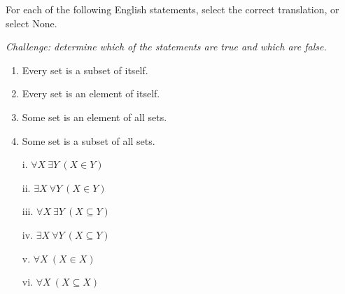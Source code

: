 
For each of the following English statements, select
the correct translation, or select None.

{\it Challenge: determine which of the statements are true and which 
are false.}

\begin{enumerate}
\item Every set is a subset of itself.

\item Every set is an element of itself.

\item Some set is an element of all sets.

\item Some set is a subset of all sets.
\end{enumerate}

\begin{enumerate}
\item[i.] $\forall X ~\exists Y ~(X \in Y)$
\item[ii.] $\exists X ~\forall Y ~(X \in Y)$
\item[iii.] $\forall X ~\exists Y ~(X \subseteq Y)$
\item[iv.] $\exists X ~\forall Y ~(X \subseteq Y)$
\item[v.] $\forall X ~(X \in X)$
\item[vi.] $\forall X ~(X \subseteq X)$ 
\end{enumerate}